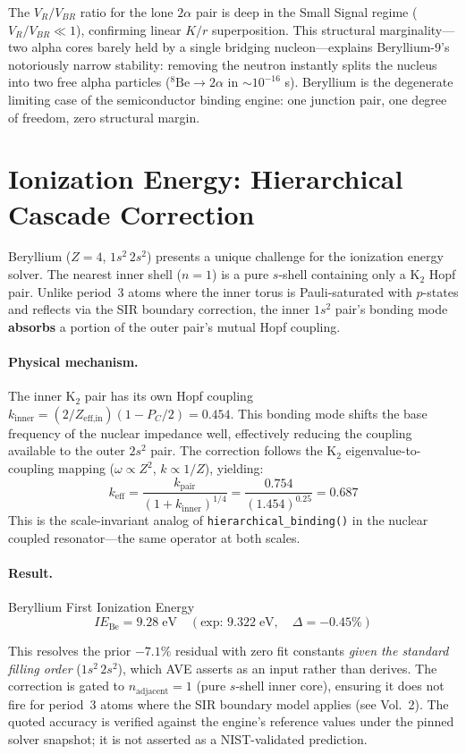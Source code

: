 The $V_R/V_{BR}$ ratio for the lone $2\alpha$ pair is deep in the Small Signal regime ($V_R/V_{BR} \ll 1$), confirming linear $K/r$ superposition. This structural marginality---two alpha cores barely held by a single bridging nucleon---explains Beryllium-9's notoriously narrow stability: removing the neutron instantly splits the nucleus into two free alpha particles ($^8\text{Be} \to 2\alpha$ in $\sim 10^{-16}$ s). Beryllium is the degenerate limiting case of the semiconductor binding engine: one junction pair, one degree of freedom, zero structural margin.

\section{Ionization Energy: Hierarchical Cascade Correction}
\label{sec:be_ie}

Beryllium ($Z = 4$, $1s^2\,2s^2$) presents a unique challenge for the ionization energy solver.  The nearest inner shell ($n = 1$) is a pure $s$-shell containing only a K$_2$ Hopf pair.  Unlike period~3 atoms where the inner torus is Pauli-saturated with $p$-states and reflects via the SIR boundary correction, the inner $1s^2$ pair's bonding mode \textbf{absorbs} a portion of the outer pair's mutual Hopf coupling.

\paragraph{Physical mechanism.}
The inner K$_2$ pair has its own Hopf coupling $k_\text{inner} = (2/Z_\text{eff,in})(1 - P_C/2) = 0.454$.  This bonding mode shifts the base frequency of the nuclear impedance well, effectively reducing the coupling available to the outer $2s^2$ pair.  The correction follows the K$_2$ eigenvalue-to-coupling mapping ($\omega \propto Z^2$, $k \propto 1/Z$), yielding:
\begin{equation}
    k_\text{eff} = \frac{k_\text{pair}}{(1 + k_\text{inner})^{1/4}} = \frac{0.754}{(1.454)^{0.25}} = 0.687
\end{equation}
This is the scale-invariant analog of \texttt{hierarchical\_binding()} in the nuclear coupled resonator---the same operator at both scales.

\paragraph{Result.}
\begin{resultbox}{Beryllium First Ionization Energy}
\begin{equation}
    IE_\text{Be} = 9.28\;\text{eV} \quad (\text{exp: } 9.322\;\text{eV}, \quad \Delta = -0.45\%)
\end{equation}
\end{resultbox}
\noindent This resolves the prior $-7.1\%$ residual with zero fit constants \emph{given the standard filling order} ($1s^2\,2s^2$), which AVE asserts as an input rather than derives.  The correction is gated to $n_\text{adjacent} = 1$ (pure $s$-shell inner core), ensuring it does not fire for period~3 atoms where the SIR boundary model applies (see Vol.~2).  The quoted accuracy is verified against the engine's reference values under the pinned solver snapshot; it is not asserted as a NIST-validated prediction.

